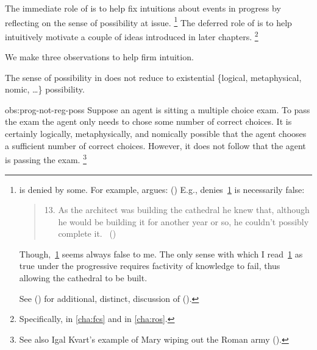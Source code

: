 \begin{note}
  The immediate role of \assuPP{} is to help fix intuitions about events in progress by reflecting on the sense of possibility at issue.%
  \footnote{
     is denied by some.
    For example, \citeauthor{Szabo:2004ul} argues:
    (\citeyear[40]{Szabo:2004ul})
    E.g., \citeauthor{Szabo:2004ul} denies~\ref{Szabo:Arch} is necessarily false:
    \begin{quote}
      \begin{enumerate}[label=(\arabic*), ref=(\arabic*)]
        \setcounter{enumi}{12}
      \item
        \label{Szabo:Arch}
        As the architect was building the cathedral he knew that, although he would be building it for another year or so, he couldn't possibly complete it.%
        \mbox{ }\hfill\mbox{(\citeyear[38]{Szabo:2004ul})}
      \end{enumerate}
    \end{quote}
    Though,~\ref{Szabo:Arch} seems always false to me.
    The only sense with which I read~\ref{Szabo:Arch} as true under the progressive requires factivity of knowledge to fail, thus allowing the cathedral to be built.

    See (\cite[1245]{Portner:2011vi}) for additional, distinct, discussion of (\cite{Szabo:2004ul}).
  }
  The deferred role of \assuPP{} is to help intuitively motivate a couple of ideas introduced in later chapters.%
  \footnote{
    Specifically,  in \autoref{cha:fcs} and  in \autoref{cha:ros}.
  }

  We make three observations to help firm intuition.

  \begin{observation}%
    \label{obs:prog-not-reg-poss}%
    The sense of possibility in \assuPP{} does not reduce to existential \{logical, metaphysical, nomic, \dots\} possibility.
  \end{observation}
  \begin{motivation}{obs:prog-not-reg-poss}
    Suppose an agent is sitting a multiple choice exam.
    To pass the exam the agent only needs to chose some number of correct choices.
    It is certainly logically, metaphysically, and nomically possible that the agent chooses a sufficient number of correct choices.
    However, it does not follow that the agent is passing the exam.%
    \footnote{
      See also Igal Kvart's example of Mary wiping out the Roman army (\cite[18]{Landman:1992wh}).
    }
  \end{motivation}


\end{note}
